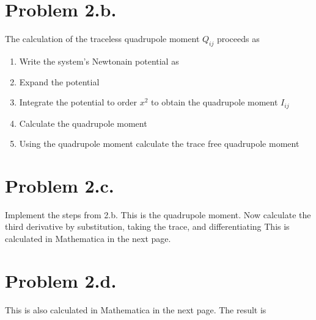 \documentclass{article}
\begin{document}
\section*{Problem 2.b.}
The calculation of the traceless quadrupole moment $Q_{ij}$ proceeds as 
\begin{enumerate}
\item Write the system's Newtonain potential as
\item Expand the potential
\item Integrate the potential to order $x^2$ to obtain the quadrupole moment $I_{ij}$
\item Calculate the quadrupole moment
\item Using the quadrupole moment calculate the trace free quadrupole moment
\end{enumerate}
\section*{Problem 2.c.}
Implement the steps from 2.b. 
This is the quadrupole moment. Now calculate the third derivative by substitution, taking the trace, and differentiating 
This is calculated in Mathematica in the next page.
\section*{Problem 2.d.}
This is also calculated in Mathematica in the next page. The result is
\end{document}
